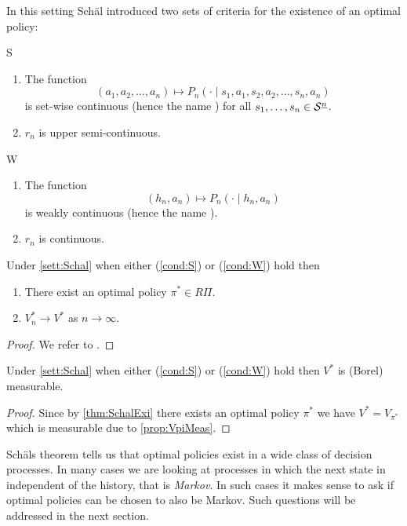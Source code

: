 In this setting Schäl introduced two sets of criteria for the existence
of an optimal policy:

\begin{cond}{S}
  \leavevmode
  \begin{enumerate}
    \item The function \[
	(a_1, a_2, \dots, a_n) \mapsto
	P_n(\cdot \mid s_1, a_1, s_2, a_2, \dots, s_n, a_n)
      \]
      is set-wise continuous (hence the name )
      for all $s_1, \dots, s_n \in \mathcal{S}^{\underline{n}}$.
    \item $r_n$ is upper semi-continuous.
  \end{enumerate}
  \label{cond:S}
\end{cond}

\begin{cond}{W}
  \leavevmode
  \begin{enumerate}
    \item The function
      \[(h_n, a_n) \mapsto P_n(\cdot \mid h_n, a_n)\]
	is weakly continuous (hence the name ).
    \item $r_n$ is continuous.
  \end{enumerate}
  \label{cond:W}
\end{cond}

\begin{thm}[Schäl]
  Under \cref{sett:Schal} when either (\cref{cond:S}) or (\cref{cond:W}) hold
  then
  \begin{enumerate}
    \item There exist an optimal policy $\pi^* \in R\Pi$.
    \item $V^*_n \to V^*$ as $n \to \infty$.
  \end{enumerate}
  \label{thm:SchalExi}
\end{thm}
\begin{proof}
  We refer to . %
\end{proof}

\begin{cor}
  Under \cref{sett:Schal} when either (\cref{cond:S}) or (\cref{cond:W}) hold then
  $V^*$ is (Borel) measurable.
\end{cor}
\begin{proof}
  Since by \cref{thm:SchalExi} there exists an optimal policy $\pi^*$ we have
  $V^* = V_{\pi^*}$ which is measurable due to \cref{prop:VpiMeas}.
\end{proof}

Schäls theorem tells us that optimal policies exist in a wide class
of decision processes. In many cases we are looking at processes
in which the next state in independent of the history,
that is \emph{Markov}.
In such cases it makes sense to ask if optimal policies can be chosen
to also be Markov.
Such questions will be addressed in the next section.

